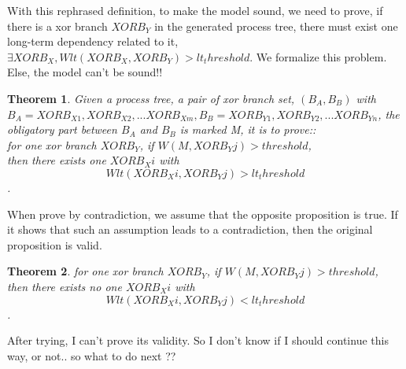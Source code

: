 \documentclass[]{article}
\newtheorem{mytheorem}{Theorem}[section]
\begin{document}
With this rephrased definition, to make the model sound, we need to prove, if there is a xor branch $XORB_Y$ in the generated process tree, there must exist one long-term dependency related to it, $\exists XORB_X, Wlt(XORB_X,XORB_Y) > lt_threshold$. We formalize this problem. Else, the model can't be sound!!
\begin{mytheorem}
Given a process tree, a pair of xor branch set, $(B_A,B_B)$ with $B_A={XORB_{X1}, XORB_{X2},...XORB_{Xm}}, B_B={XORB_{Y1}, XORB_{Y2},...XORB_{Yn}}$, the obligatory part between $B_A$ and $B_B$ is marked M, it is to prove:: \\
for one xor branch $XORB_Y$, if $W(M, XORB_Yj) > threshold$, \\ then there exists one $XORB_Xi$ with 
\[Wlt(XORB_Xi, XORB_Yj)> lt_threshold\]. 
\end{mytheorem}
When prove by contradiction, we assume that the opposite proposition is true. If it shows that such an assumption leads to a contradiction, then the original proposition is valid. 
\begin{mytheorem}
	for one xor branch $XORB_Y$, if $W(M, XORB_Yj) > threshold$, \\ then there exists no one $XORB_Xi$ with 
	\[Wlt(XORB_Xi, XORB_Yj)<lt_threshold\]. 
\end{mytheorem}
After trying, I can't prove its validity. So I don't know if I should continue this way, or not.. so what to do next ??
\end{document}
